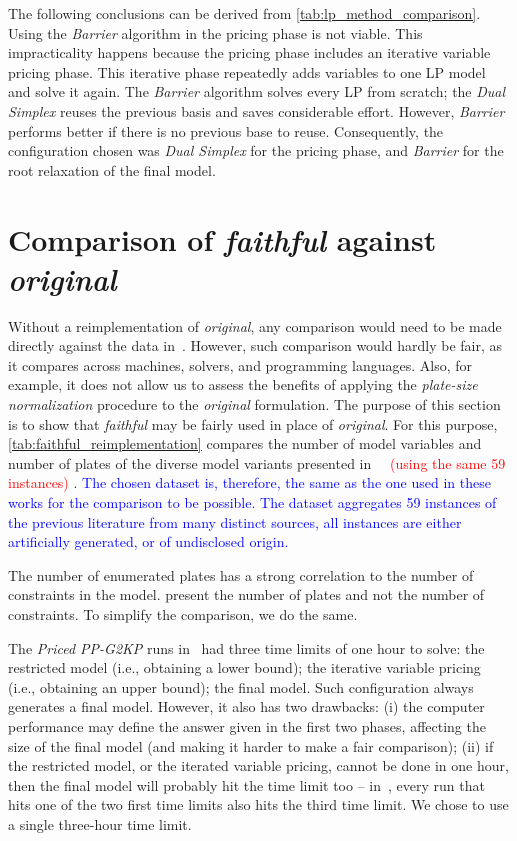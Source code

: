 \documentclass[ppgc,tese,english,formais,babel]{iiufrgs}
\newif\iffinalversion
\newcommand{\newtext}[1]{\iffinalversion%
#1%
\else%
\textcolor{blue}{#1}%
\fi%
}
\newcommand{\oldtext}[1]{\iffinalversion%
\else%
\textcolor{red}{#1}%
\fi%
}
\begin{document}
The following conclusions can be derived from \cref{tab:lp_method_comparison}.
Using the \emph{Barrier} algorithm in the pricing phase is not viable.
This impracticality happens because the pricing phase includes an iterative variable pricing phase.
This iterative phase repeatedly adds variables to one LP model and solve it again.
The \emph{Barrier} algorithm solves every LP from scratch;
the \emph{Dual Simplex} reuses the previous basis and saves considerable effort.
However, \emph{Barrier} performs better if there is no previous base to reuse.
Consequently, the configuration chosen was \emph{Dual Simplex} for the pricing phase, and \emph{Barrier} for the root relaxation of the final model.

\section{Comparison of \emph{faithful} against \emph{original}}
\label{sec:faithful_reimplementation}

Without a reimplementation of \emph{original}, any comparison would need to be made directly against the data in~\citet{dimitri_thesis}.
However, such comparison would hardly be fair, as it compares across machines, solvers, and programming languages.
Also, for example, it does not allow us to assess the benefits of applying the \emph{plate-size normalization} procedure to the \emph{original} formulation.
The purpose of this section is to show that \emph{faithful} may be fairly used in place of \emph{original}.
For this purpose, \cref{tab:faithful_reimplementation} compares the number of model variables and number of plates of the diverse model variants presented in~\citet{dimitri_thesis}\oldtext{~(using the same 59 instances)}.
\newtext{The chosen dataset is, therefore, the same as the one used in these works for the comparison to be possible. The dataset aggregates 59 instances of the previous literature from many distinct sources, all instances are either artificially generated, or of undisclosed origin.}
The number of enumerated plates has a strong correlation to the number of constraints in the model.
\citet{dimitri_thesis} present the number of plates and not the number of constraints.
To simplify the comparison, we do the same.

The \emph{Priced PP-G2KP} runs in~\citet{dimitri_thesis} had three time limits of one hour to solve: the restricted model (i.e., obtaining a lower bound); the iterative variable pricing (i.e., obtaining an upper bound); the final model.
Such configuration always generates a final model.
However, it also has two drawbacks:
(i) the computer performance may define the answer given in the first two phases, affecting the size of the final model (and making it harder to make a fair comparison);
(ii) if the restricted model, or the iterated variable pricing, cannot be done in one hour, then the final model will probably hit the time limit too -- in~\citet{dimitri_thesis}, every run that hits one of the two first time limits also hits the third time limit.
We chose to use a single three-hour time limit.
\end{document}
